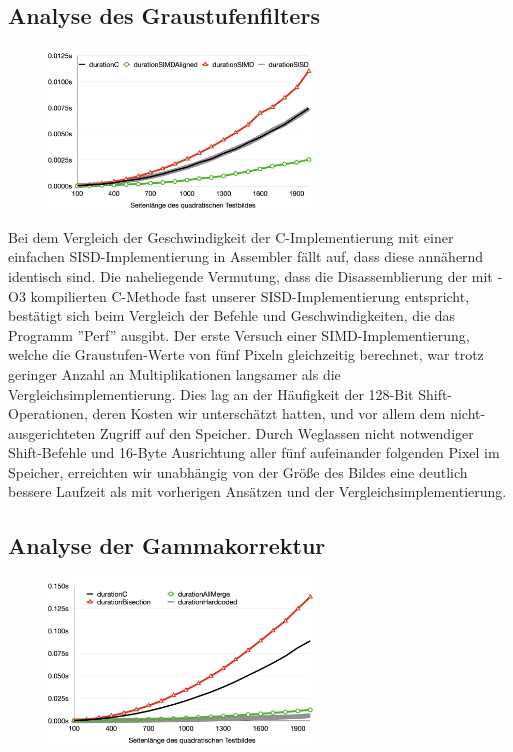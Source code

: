 \documentclass[course=erap]{aspdoc}
\begin{document}
	\subsection{Analyse des Graustufenfilters}
	\begin{figure}
		\includegraphics[width=7cm]{Images/Grayscale.png}
	\end{figure}
	Bei dem Vergleich der Geschwindigkeit der C-Implementierung mit einer einfachen SISD-Implementierung in Assembler fällt auf, dass diese annähernd identisch sind. Die naheliegende Vermutung, dass die Disassemblierung der mit -O3 kompilierten C-Methode fast unserer SISD-Implementierung entspricht, bestätigt sich beim Vergleich der Befehle und Geschwindigkeiten, die das Programm ”Perf” ausgibt.
	Der erste Versuch einer SIMD-Implementierung, welche die Graustufen-Werte von fünf Pixeln gleichzeitig berechnet, war trotz geringer Anzahl an Multiplikationen langsamer als die Vergleichsimplementierung. Dies lag an der Häufigkeit der 128-Bit Shift-Operationen, deren Kosten wir unterschätzt hatten, und vor allem dem nicht-ausgerichteten Zugriff auf den Speicher.
	Durch Weglassen nicht notwendiger Shift-Befehle und 16-Byte Ausrichtung aller fünf aufeinander folgenden Pixel im Speicher, erreichten wir unabhängig von der Größe des Bildes eine deutlich bessere Laufzeit als mit vorherigen Ansätzen und der Vergleichsimplementierung.
	\subsection{Analyse der Gammakorrektur}
	\begin{figure}
		\includegraphics[width=7cm]{Images/Gammacorrection.png}
	\end{figure}
\end{document}
